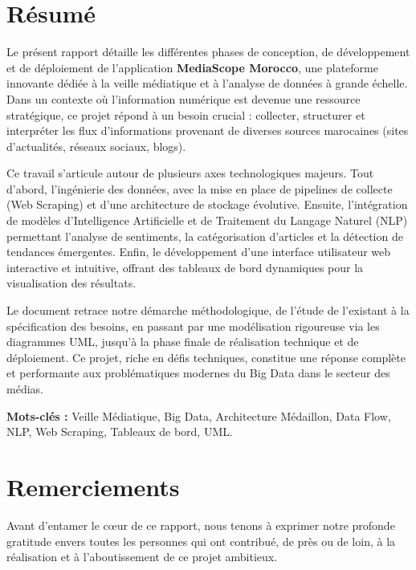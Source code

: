 \documentclass[12pt,a4paper,oneside]{report}
\begin{document}
\chapter*{Résumé}

Le présent rapport détaille les différentes phases de conception, de développement et de déploiement de l'application \textbf{MediaScope Morocco}, une plateforme innovante dédiée à la veille médiatique et à l'analyse de données à grande échelle. Dans un contexte où l'information numérique est devenue une ressource stratégique, ce projet répond à un besoin crucial : collecter, structurer et interpréter les flux d'informations provenant de diverses sources marocaines (sites d'actualités, réseaux sociaux, blogs).

Ce travail s'articule autour de plusieurs axes technologiques majeurs. Tout d'abord, l'ingénierie des données, avec la mise en place de pipelines de collecte (Web Scraping) et d'une architecture de stockage évolutive. Ensuite, l'intégration de modèles d'Intelligence Artificielle et de Traitement du Langage Naturel (NLP) permettant l'analyse de sentiments, la catégorisation d'articles et la détection de tendances émergentes. Enfin, le développement d'une interface utilisateur web interactive et intuitive, offrant des tableaux de bord dynamiques pour la visualisation des résultats.

Le document retrace notre démarche méthodologique, de l'étude de l'existant à la spécification des besoins, en passant par une modélisation rigoureuse via les diagrammes UML, jusqu'à la phase finale de réalisation technique et de déploiement. Ce projet, riche en défis techniques, constitue une réponse complète et performante aux problématiques modernes du Big Data dans le secteur des médias.

\vspace{1cm}
\textbf{Mots-clés :} Veille Médiatique, Big Data, Architecture Médaillon, Data Flow, NLP, Web Scraping, Tableaux de bord, UML.

\newpage

\chapter*{Remerciements}

Avant d'entamer le cœur de ce rapport, nous tenons à exprimer notre profonde gratitude envers toutes les personnes qui ont contribué, de près ou de loin, à la réalisation et à l'aboutissement de ce projet ambitieux.
\end{document}
